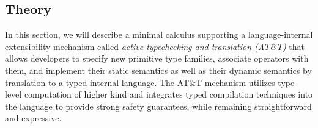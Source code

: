 \subsection{Theory}\label{atlam}
In this section, we will describe a minimal calculus supporting a language-internal extensibility mechanism called \emph{active typechecking and translation (AT\&T)} that allows developers to specify new primitive type families, associate operators with them, and implement their static semantics as well as their dynamic semantics by translation to a typed internal language. The AT\&T mechanism utilizes type-level computation of higher kind and integrates typed compilation techniques into the language to provide strong safety guarantees, while remaining straightforward and expressive.




